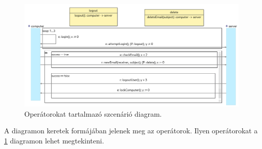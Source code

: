 
\begin{figure}[!ht]
    \centering
    \includegraphics[width=150mm, keepaspectratio]{figures/diagramOperatorExample.png}
    \caption{Operátorokat tartalmazó szcenárió diagram.}
    \label{sirius_operators}
\end{figure}

A diagramon keretek formájában jelenek meg az operátorok.
Ilyen operátorokat a \ref{sirius_operators} diagramon lehet megtekinteni.